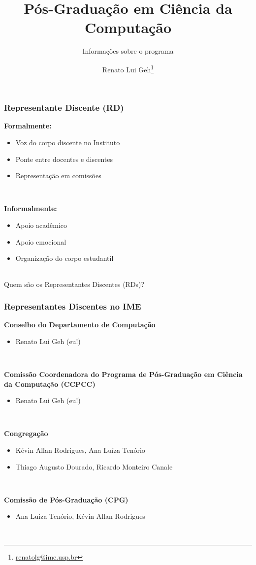\documentclass{beamer}
\title{\LARGE Pós-Graduação em Ciência da Computação}
\subtitle{\Large Informações sobre o programa}
\author{Renato Lui Geh\thanks{\url{renatolg@ime.usp.br}}}
\date{}
\begin{document}
\maketitle

\begin{frame}
  \frametitle{Representante Discente (RD)}

  \textbf{Formalmente:}
  \begin{itemize}
    \item Voz do corpo discente no Instituto
    \item Ponte entre docentes e discentes
    \item Representação em comissões
  \end{itemize}~\\\pause

  \textbf{Informalmente:}
  \begin{itemize}
    \item Apoio acadêmico
    \item Apoio emocional
    \item Organização do corpo estudantil
  \end{itemize}~\\

  Quem são os Representantes Discentes (RDs)?
\end{frame}

\begin{frame}
  \frametitle{Representantes Discentes no IME}

  \textbf{Conselho do Departamento de Computação}
  \begin{itemize}
    \item Renato Lui Geh (eu!)
  \end{itemize}~\\\pause

  \textbf{Comissão Coordenadora do Programa de Pós-Graduação em Ciência da Computação (CCPCC)}
  \begin{itemize}
    \item Renato Lui Geh (eu!)
  \end{itemize}~\\\pause

  \textbf{Congregação}
  \begin{itemize}
    \item Kévin Allan Rodrigues, Ana Luíza Tenório
    \item Thiago Augusto Dourado, Ricardo Monteiro Canale
  \end{itemize}~\\\pause

  \textbf{Comissão de Pós-Graduação (CPG)}
  \begin{itemize}
    \item Ana Luiza Tenório, Kévin Allan Rodrigues
  \end{itemize}~\\ 
\end{frame}
\end{document}
